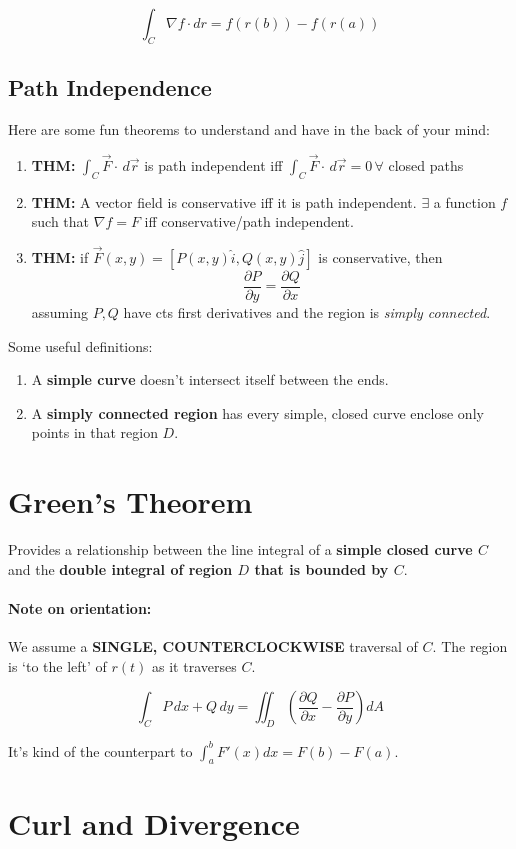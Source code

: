 \documentclass[a4paper,12pt]{report}
\begin{document}
$$\int_C \nabla f \cdot dr = f(r(b)) - f(r(a))$$

\subsection{Path Independence}
Here are some fun theorems to understand and have in the back of your mind: 
\begin{enumerate}
\item \textbf{THM: } $\int_C \vec{F}\cdot\,d\vec{r}$ is path independent iff 
$\int_C \vec{F}\cdot\,d\vec{r} = 0 \, \forall$ closed paths
\item \textbf{THM: } A vector field is conservative iff it is path independent. 
$\exists$ a function $f$ such that $\nabla f = F$ iff conservative/path independent.
\item \textbf{THM: } if $\vec{F}(x, y) = [P(x, y)\hat{i}, Q(x, y)\hat{j}]$ is conservative, 
then $$\frac{\partial P}{\partial y} = \frac{\partial Q}{\partial x}$$ assuming $P, Q$ have cts first derivatives and 
the region is \textit{simply connected}.
\end{enumerate}

Some useful definitions:
\begin{enumerate}
\item A \textbf{simple curve} doesn't intersect itself between the ends.
\item A \textbf{simply connected region} has every simple, closed curve enclose only points in that region $D$.
\end{enumerate}

\section{Green's Theorem}
Provides a relationship between the line integral of a \textbf{simple closed curve $C$} and the \textbf{double integral of 
region $D$ that is bounded by $C$}. 

\paragraph{Note on orientation: } We assume a \textbf{SINGLE, COUNTERCLOCKWISE} traversal of $C$. The region is `to the left' 
of $r(t)$ as it traverses $C$.

$$\int_C P\,dx+Q\,dy = \iint_D (\frac{\partial Q}{\partial x} - \frac{\partial P}{\partial y})dA$$

It's kind of the counterpart to $\int_a^b F'(x) dx = F(b)-F(a)$.

\section{Curl and Divergence}
\end{document}
